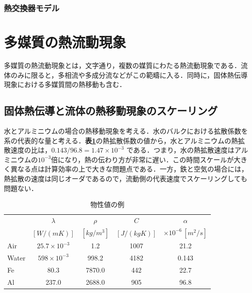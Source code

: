 
%
\subsubsection{熱交換器モデル}

%
\section{多媒質の熱流動現象}
多媒質の熱流動現象とは，文字通り，複数の媒質にわたる熱流動現象である．流体のみに限ると，多相流や多成分流などがこの範疇に入る．同時に，固体熱伝導現象における多媒質間の熱移動も含む．

%
\subsection{固体熱伝導と流体の熱移動現象のスケーリング}
水とアルミニウムの場合の熱移動現象を考える．水のバルクにおける拡散係数を系の代表的な量と考える．\textbf{表\ref{tbl:medium property}}の熱拡散係数の値から，水とアルミニウムの熱拡散速度の比は，$0.143/96.8=1.47\times10^{-3}$ である．つまり，水の熱拡散速度はアルミニウムの$10^{-3}$倍になり，熱の伝わり方が非常に遅い．この時間スケールが大きく異なる点は計算効率の上で大きな問題点である．一方，鉄と空気の場合には，熱拡散の速度は同じオーダであるので，流動側の代表速度でスケーリングしても問題ない．

\begin{table}[htdp]
\caption{物性値の例}
\begin{center}
\small
\begin{tabular}{lcccc}\toprule
 & $\lambda$ & $\rho$ & $C$ & $\alpha$\\ 
 & $[W/(mK)]$ & $[kg/m^3]$ & $[J/(kgK)]$ & $\times 10^{-6}\, [m^{2}/s]$\\ \midrule
Air & $25.7 \times 10^{-3}$ & 1.2 & 1007 & 21.2\\
Water & $598 \times 10^{-3}$ & 998.2 & 4182 & 0.143\\
Fe & 80.3 & 7870.0 & 442 & 22.7\\
Al & 237.0 & 2688.0 & 905 & 96.8\\ \bottomrule
\end{tabular}
\end{center}
\label{tbl:medium property}
\end{table}



